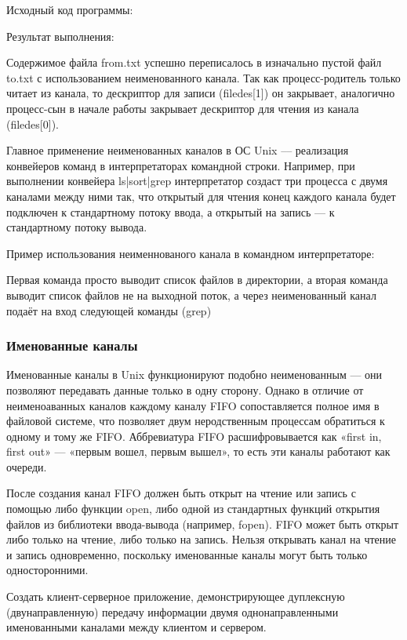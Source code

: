 \documentclass[a4paper]{article}
\begin{document}
	Исходный код программы:
	
	
	Результат выполнения:
	

	Содержимое файла from.txt успешно переписалось в изначально пустой файл to.txt с использованием неименованного канала.	Так как процесс-родитель только читает из канала, то дескриптор для записи (filedes[1]) он закрывает, аналогично процесс-сын в начале работы закрывает дескриптор для чтения из канала (filedes[0]).

	Главное применение неименованных каналов в ОС Unix --– реализация конвейеров команд в интерпретаторах командной строки. Например, при выполнении конвейера ls|sort|grep интерпретатор создаст три процесса с двумя каналами между ними так, что открытый для чтения конец каждого канала будет подключен к стандартному потоку ввода, а открытый на запись — к стандартному потоку вывода.
	
	Пример использования неименнованого канала в командном интерпретаторе:
	
	Первая команда просто выводит список файлов в директории, а вторая команда выводит список файлов не на выходной поток, а через неименованный канал подаёт на вход следующей команды (grep)
	
	
	\subsubsection{Именованные каналы}
	Именованные каналы в Unix функционируют подобно неименованным — они позволяют передавать данные только в одну сторону. Однако в отличие от неименоаванных каналов каждому каналу FIFO сопоставляется полное имя в файловой системе, что позволяет двум неродственным процессам обратиться к одному и тому же FIFO. Аббревиатура FIFO расшифровывается как «first in, first out» — «первым вошел, первым вышел», то есть эти каналы работают как очереди.
	
	После создания канал FIFO должен быть открыт на чтение или запись с помощью либо функции open, либо одной из стандартных функций открытия файлов из библиотеки ввода-вывода (например, fopen). FIFO может быть открыт либо только на чтение, либо только на запись. Нельзя открывать канал на чтение и запись одновременно, поскольку именованные каналы могут быть только односторонними.

	Создать клиент-серверное приложение, демонстрирующее дуплексную (двунаправленную) передачу информации двумя однонаправленными именованными каналами между клиентом и сервером.
	
\end{document}
